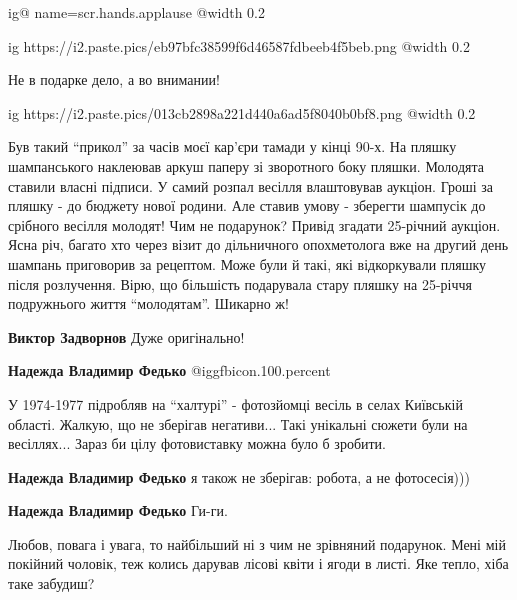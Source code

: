 \begin{itemize}

\ifcmt
  ig@ name=scr.hands.applause
  @width 0.2
\fi


\ifcmt
  ig https://i2.paste.pics/eb97bfc38599f6d46587fdbeeb4f5beb.png
  @width 0.2
\fi

Не в подарке дело, а во внимании!

\ifcmt
  ig https://i2.paste.pics/013cb2898a221d440a6ad5f8040b0bf8.png
  @width 0.2
\fi


Був такий \enquote{прикол} за часів моєї кар'єри тамади у кінці 90-х. На пляшку
шампанського наклеював аркуш паперу зі зворотного боку пляшки. Молодята ставили
власні підписи. У самий розпал весілля влаштовував аукціон. Гроші за пляшку -
до бюджету нової родини. Але ставив умову - зберегти шампусік до срібного
весілля молодят! Чим не подарунок? Привід згадати 25-річний аукціон. Ясна річ,
багато хто через візит до дільничного опохметолога вже на другий день шампань
приговорив за рецептом. Може були й такі, які відкоркували пляшку після
розлучення. Вірю, що більшість подарувала стару пляшку на 25-річчя подружнього
життя \enquote{молодятам}. Шикарно ж!

\begin{itemize} %
\textbf{Виктор Задворнов} Дуже оригінально!

\textbf{Надежда Владимир Федько}  @igg{fbicon.100.percent} 


У 1974-1977 підробляв на \enquote{халтурі} - фотозйомці весіль в селах Київській
області. Жалкую, що не зберігав негативи... Такі унікальні сюжети були на
весіллях... Зараз би цілу фотовиставку можна було б зробити.


\textbf{Надежда Владимир Федько} я також не зберігав: робота, а не фотосесія)))

\textbf{Надежда Владимир Федько} Ги-ги.


Любов, повага і увага, то найбільший ні з чим не зрівняний подарунок. Мені мій
покійний чоловік, теж колись дарував лісові квіти і ягоди в листі. Яке тепло,
хіба таке забудиш?

\end{itemize} %


\end{itemize}
